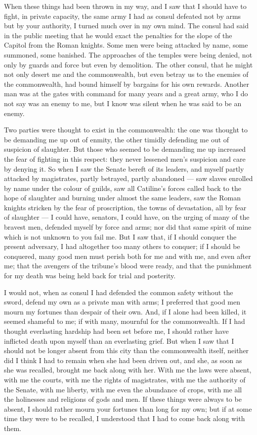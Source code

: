  When these things had been thrown in my way, and I saw that I should have to fight, in private capacity, the same army I had as consul defeated not by arms but by your authority, I turned much over in my own mind. The consul had said in the public meeting that he would exact the penalties for the slope of the Capitol from the Roman knights. Some men were being attacked by name, some summoned, some banished. The approaches of the temples were being denied, not only by guards and force but even by demolition. The other consul, that he might not only desert me and the commonwealth, but even betray us to the enemies of the commonwealth, had bound himself by bargains for his own rewards. Another man was at the gates with command for many years and a great army, who I do not say was an enemy to me, but I know was silent when he was said to be an enemy.

 Two parties were thought to exist in the commonwealth: the one was thought to be demanding me up out of enmity, the other timidly defending me out of suspicion of slaughter. But those who seemed to be demanding me up increased the fear of fighting in this respect: they never lessened men's suspicion and care by denying it. So when I saw the Senate bereft of its leaders, and myself partly attacked by magistrates, partly betrayed, partly abandoned --- saw slaves enrolled by name under the colour of guilds, saw all Catiline's forces called back to the hope of slaughter and burning under almost the same leaders, saw the Roman knights stricken by the fear of proscription, the towns of devastation, all by fear of slaughter --- I could have, senators, I could have, on the urging of many of the bravest men, defended myself by force and arms; nor did that same spirit of mine which is not unknown to you fail me. But I saw that, if I should conquer the present adversary, I had altogether too many others to conquer; if I should be conquered, many good men must perish both for me and with me, and even after me; that the avengers of the tribune's blood were ready, and that the punishment for my death was being held back for trial and posterity.

 I would not, when as consul I had defended the common safety without the sword, defend my own as a private man with arms; I preferred that good men mourn my fortunes than despair of their own. And, if I alone had been killed, it seemed shameful to me; if with many, mournful for the commonwealth. If I had thought everlasting hardship had been set before me, I should rather have inflicted death upon myself than an everlasting grief. But when I saw that I should not be longer absent from this city than the commonwealth itself, neither did I think I had to remain when she had been driven out, and she, as soon as she was recalled, brought me back along with her. With me the laws were absent, with me the courts, with me the rights of magistrates, with me the authority of the Senate, with me liberty, with me even the abundance of crops, with me all the holinesses and religions of gods and men. If these things were always to be absent, I should rather mourn your fortunes than long for my own; but if at some time they were to be recalled, I understood that I had to come back along with them.

